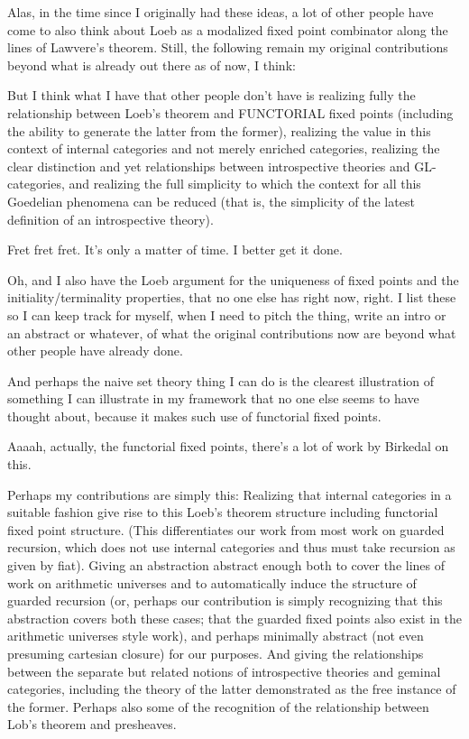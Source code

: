 Alas, in the time since I originally had these ideas, a lot of other people have come to also think about Loeb as a modalized fixed point combinator along the lines of Lawvere's theorem. Still, the following remain my original contributions beyond what is already out there as of now, I think:

But I think what I have that other people don't have is realizing fully the relationship between Loeb's theorem and FUNCTORIAL fixed points (including the ability to generate the latter from the former), realizing the value in this context of internal categories and not merely enriched categories, realizing the clear distinction and yet relationships between introspective theories and GL-categories, and realizing the full simplicity to which the context for all this Goedelian phenomena can be reduced (that is, the simplicity of the latest definition of an introspective theory).

Fret fret fret. It's only a matter of time. I better get it done.

Oh, and I also have the Loeb argument for the uniqueness of fixed points and the initiality/terminality properties, that no one else has right now, right. I list these so I can keep track for myself, when I need to pitch the thing, write an intro or an abstract or whatever, of what the original contributions now are beyond what other people have already done.

And perhaps the naive set theory thing I can do is the clearest illustration of something I can illustrate in my framework that no one else seems to have thought about, because it makes such use of functorial fixed points.


Aaaah, actually, the functorial fixed points, there's a lot of work by Birkedal on this.

Perhaps my contributions are simply this: Realizing that internal categories in a suitable fashion give rise to this Loeb's theorem structure including functorial fixed point structure. (This differentiates our work from most work on guarded recursion, which does not use internal categories and thus must take recursion as given by fiat). Giving an abstraction abstract enough both to cover the lines of work on arithmetic universes and to automatically induce the structure of guarded recursion (or, perhaps our contribution is simply recognizing that this abstraction covers both these cases; that the guarded fixed points also exist in the arithmetic universes style work), and perhaps minimally abstract (not even presuming cartesian closure) for our purposes. And giving the relationships between the separate but related notions of introspective theories and geminal categories, including the theory of the latter demonstrated as the free instance of the former. Perhaps also some of the recognition of the relationship between Lob's theorem and presheaves.

